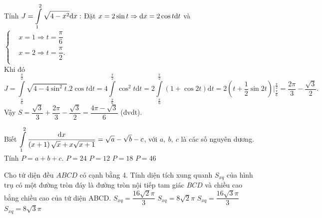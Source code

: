 \documentclass[12pt,a4paper,twoside]{book}
\begin{document}
\begin{ex}
{		Tính $J=\displaystyle\int \limits_{1}^{2}{\sqrt{4-x^2}{\rm d}x}:$ Đặt $x=2\sin t\Rightarrow {\rm d}x=2\cos t{\rm d}t$ và $\begin{cases}
		& x=1\Rightarrow t=\dfrac {\pi}{6} \\
		& x=2\Rightarrow t=\dfrac {\pi}{2}. \\
		\end{cases}$ \\
		Khi đó 
		$$ J=\displaystyle\int \limits_{\frac {\pi}{6}}^{\frac {\pi}{2}}{\sqrt{4-4\sin^2t}. 2\cos t \text{d}t}=4\displaystyle\int \limits_{\frac {\pi}{6}}^{\frac {\pi}{2}}\cos^2 t \text{d}t=2\displaystyle\int \limits_{\frac {\pi}{6}}^{\frac {\pi}{2}}{\left(1+\cos 2t \right)\text{d}t}= 2\left(t+\dfrac {1}{2}\sin 2t \right) \big|_{\frac {\pi}{6}}^{\frac{\pi}{2}}=\dfrac {2\pi}{3}-\dfrac {\sqrt{3}}{2}.$$
		Vậy $S=\dfrac {\sqrt{3}}{3}+\dfrac {2\pi}{3}-\dfrac {\sqrt{3}}{2}=\dfrac {4\pi -\sqrt{3}}{6}$ (đvdt).
		
	}
\end{ex}
\begin{ex}%
	Biết $\displaystyle\int \limits_{1}^{2}{\frac {\text{\rm d}x}{\left(x+1 \right)\sqrt{x}+x\sqrt{x+1}}}=\sqrt{a}-\sqrt{b}-c$,  với $a, \ b, \ c$ là các số nguyên dương. Tính $P=a+b+c.$
	\choice
	{ $P=24$} 	
	{ $P=12$ } 	
	{ $P=18$} 	
	{\True $P=46$}
\end{ex}
\begin{ex}%
	Cho tứ diện đều $ABCD$ có cạnh bằng 4. Tính diện tích xung quanh $S_{xq}$ của hình trụ có một đường tròn đáy là đường tròn nội tiếp tam giác $BCD$ và chiều cao bằng chiều cao của tứ diện ABCD.
	\choice
	{\True $S_{xq}=\dfrac{16\sqrt{2}\pi}{3}$}
	{$S_{xq}=8\sqrt{2}\pi$}
	{$S_{xq}=\dfrac{16\sqrt{3}\pi}{3}$}
	{$S_{xq}=8\sqrt{3}\pi$}
\end{ex}
\end{document}
